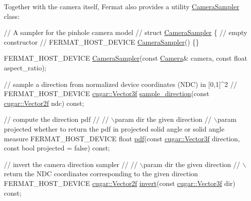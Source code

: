 \begin{DoxyParagraph}{}
Together with the camera itself, Fermat also provides a utility \hyperlink{struct_camera_sampler}{Camera\+Sampler} class\+: ~\newline

\begin{DoxyCode}
\textcolor{comment}{// A sampler for the pinhole camera model}
\textcolor{comment}{//}
\textcolor{keyword}{struct }\hyperlink{struct_camera_sampler}{CameraSampler}
\{
   \textcolor{comment}{// empty constructor}
   \textcolor{comment}{//}
   FERMAT\_HOST\_DEVICE
   \hyperlink{struct_camera_sampler_a50332d884a007ab1ffcb05215af5d92a}{CameraSampler}() \{\}

   FERMAT\_HOST\_DEVICE
   \hyperlink{struct_camera_sampler_a50332d884a007ab1ffcb05215af5d92a}{CameraSampler}(\textcolor{keyword}{const} \hyperlink{struct_camera}{Camera}& camera, \textcolor{keyword}{const} \textcolor{keywordtype}{float} aspect\_ratio);

   \textcolor{comment}{// sample a direction from normalized device coordinates (NDC) in [0,1]^2}
   \textcolor{comment}{//}
   FERMAT\_HOST\_DEVICE
   \hyperlink{structcugar_1_1_vector}{cugar::Vector3f} \hyperlink{struct_camera_sampler_ac502e1699c99c595b773b1419225fe32}{sample\_direction}(\textcolor{keyword}{const} 
      \hyperlink{structcugar_1_1_vector}{cugar::Vector2f} ndc) \textcolor{keyword}{const};

   \textcolor{comment}{// compute the direction pdf}
   \textcolor{comment}{//}
   \textcolor{comment}{// \(\backslash\)param dir               the given direction}
   \textcolor{comment}{// \(\backslash\)param projected         whether to return the pdf in projected solid angle or solid angle measure}
   FERMAT\_HOST\_DEVICE
   \textcolor{keywordtype}{float} \hyperlink{struct_camera_sampler_a0edd94ccee6da3180f13845d189bc758}{pdf}(\textcolor{keyword}{const} \hyperlink{structcugar_1_1_vector}{cugar::Vector3f} direction, \textcolor{keyword}{const} \textcolor{keywordtype}{bool} projected = \textcolor{keyword}{false}) \textcolor{keyword}{const};

   \textcolor{comment}{// invert the camera direction sampler}
   \textcolor{comment}{//}
   \textcolor{comment}{// \(\backslash\)param dir               the given direction}
   \textcolor{comment}{// \(\backslash\)return                  the NDC coordinates corresponding to the given direction}
   FERMAT\_HOST\_DEVICE
   \hyperlink{structcugar_1_1_vector}{cugar::Vector2f} \hyperlink{struct_camera_sampler_a347623323319a7111f933d4af6ac2d19}{invert}(\textcolor{keyword}{const} \hyperlink{structcugar_1_1_vector}{cugar::Vector3f} dir) \textcolor{keyword}{const};


\end{DoxyCode}
\end{DoxyParagraph}

